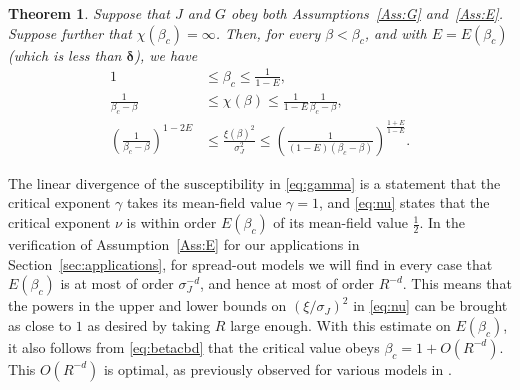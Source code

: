 \documentclass[11pt,a4paper]{article}
\numberwithin{equation}{section}
\theoremstyle{plain}
\newtheorem{Thm}{Theorem}[section]
\theoremstyle{definition}
\newcommand\1{\mathds{1}}
\newcommand{\deltamain}{\boldsymbol{\delta}}
\begin{document}
\begin{Thm}
\label{Thm:gamma-nu}
Suppose that $J$ and $G$ obey both Assumptions~\textup{\ref{Ass:G}} and~\textup{\ref{Ass:E}}.  Suppose further that $\chi(\beta_c)=\infty$.
Then, for every $\beta < \beta_c$, and with $E=E(\beta_c)$ (which is less
than $\deltamain$), we have
 \begin{align}
 \label{eq:betacbd}
    1 &\le \beta_c \le \frac{1}{1-E},
    \\
 \label{eq:gamma}
    \frac{1}{\beta_c  -\beta}
    &\le \chi(\beta)
    \le
    \frac{1}{1-E}
    \frac{1}{\beta_c -\beta },
\\
\label{eq:nu}
    \left( \frac{1}{\beta_c -\beta} \right)^{1-2E}
    &\le
    \frac{\xi(\beta)^2}{\sigma_J^2}
    \le
    \left( \frac{1}{(1-E)(\beta_c -\beta)} \right)^{\frac{1+E}{1-E}}
    .
 \end{align}
\end{Thm}

The linear divergence of the susceptibility in \eqref{eq:gamma} is a statement
that the critical exponent $\gamma$ takes its mean-field value $\gamma=1$,
and \eqref{eq:nu} states that the critical exponent $\nu$ is within order $E(\beta_c)$
of its mean-field value $\frac 12$. In the verification of Assumption~\ref{Ass:E} for our applications in
Section~\ref{sec:applications}, for spread-out models we will find in every
case that $E(\beta_c)$ is at most of order $\sigma_J^{-d}$, and hence at most of order $R^{-d}$. This means that the powers in the upper and lower bounds on $(\xi/\sigma_J)^2$ in \eqref{eq:nu} can be brought as close to $1$ as desired by taking $R$ large enough.
With this estimate on $E(\beta_c)$, it also follows from
\eqref{eq:betacbd} that the critical value obeys $\beta_c=1+O(R^{-d})$. This $O(R^{-d})$ is optimal,  as previously observed for various models in \cite{HS05y,KS24}.
\end{document}

